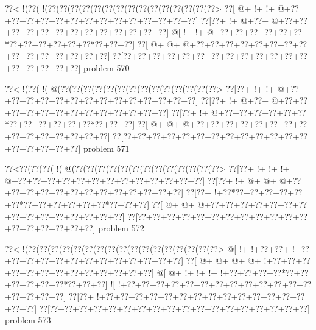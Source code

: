 \vbox{\vbox{\goo
\0??<\- !(\0??(\- !(\0??(\0??(\0??(\0??(\0??(\0??(\0??(\0??(\0??(\0??(\0??(\0??(\0??(\0??(\0??>
\0??[\- @+\- !+\- !+\- @+\0??+\0??+\0??+\0??+\0??+\0??+\0??+\0??+\0??+\0??+\0??+\0??+\0??+\0??]
\0??[\0??+\- !+\- @+\0??+\- @+\0??+\0??+\0??+\0??+\0??+\0??+\0??+\0??+\0??+\0??+\0??+\0??+\0??]
\- @[\- !+\- !+\- @+\0??+\0??+\0??+\0??+\0??+\0??*\0??+\0??+\0??+\0??+\0??+\0??*\0??+\0??+\0??]
\0??[\- @+\- @+\- @+\0??+\0??+\0??+\0??+\0??+\0??+\0??+\0??+\0??+\0??+\0??+\0??+\0??+\0??+\0??]
\0??[\0??+\0??+\0??+\0??+\0??+\0??+\0??+\0??+\0??+\0??+\0??+\0??+\0??+\0??+\0??+\0??+\0??+\0??]
}
\hfil problem 570\hfil\break
}



\vbox{\vbox{\goo
\0??<\- !(\0??(\- !(\- @(\0??(\0??(\0??(\0??(\0??(\0??(\0??(\0??(\0??(\0??(\0??(\0??(\0??(\0??>
\0??[\0??+\- !+\- !+\- @+\0??+\0??+\0??+\0??+\0??+\0??+\0??+\0??+\0??+\0??+\0??+\0??+\0??+\0??]
\0??[\0??+\- !+\- @+\0??+\- @+\0??+\0??+\0??+\0??+\0??+\0??+\0??+\0??+\0??+\0??+\0??+\0??+\0??]
\0??[\0??+\- !+\- @+\0??+\0??+\0??+\0??+\0??+\0??*\0??+\0??+\0??+\0??+\0??+\0??*\0??+\0??+\0??]
\0??[\- @+\- @+\- @+\0??+\0??+\0??+\0??+\0??+\0??+\0??+\0??+\0??+\0??+\0??+\0??+\0??+\0??+\0??]
\0??[\0??+\0??+\0??+\0??+\0??+\0??+\0??+\0??+\0??+\0??+\0??+\0??+\0??+\0??+\0??+\0??+\0??+\0??]
}
\hfil problem 571\hfil\break
}



\vbox{\vbox{\goo
\0??<\0??(\0??(\0??(\- !(\- @(\0??(\0??(\0??(\0??(\0??(\0??(\0??(\0??(\0??(\0??(\0??(\0??(\0??>
\0??[\0??+\- !+\- !+\- !+\- @+\0??+\0??+\0??+\0??+\0??+\0??+\0??+\0??+\0??+\0??+\0??+\0??+\0??]
\0??[\0??+\- !+\- @+\- @+\- @+\0??+\0??+\0??+\0??+\0??+\0??+\0??+\0??+\0??+\0??+\0??+\0??+\0??]
\0??[\0??+\- !+\0??*\0??+\0??+\0??+\0??+\0??+\0??*\0??+\0??+\0??+\0??+\0??+\0??*\0??+\0??+\0??]
\0??[\- @+\- @+\- @+\0??+\0??+\0??+\0??+\0??+\0??+\0??+\0??+\0??+\0??+\0??+\0??+\0??+\0??+\0??]
\0??[\0??+\0??+\0??+\0??+\0??+\0??+\0??+\0??+\0??+\0??+\0??+\0??+\0??+\0??+\0??+\0??+\0??+\0??]
}
\hfil problem 572\hfil\break
}



\vbox{\vbox{\goo
\0??<\- !(\0??(\0??(\0??(\0??(\0??(\0??(\0??(\0??(\0??(\0??(\0??(\0??(\0??(\0??(\0??(\0??(\0??>
\- @[\- !+\- !+\0??+\0??+\- !+\0??+\0??+\0??+\0??+\0??+\0??+\0??+\0??+\0??+\0??+\0??+\0??+\0??]
\0??[\- @+\- @+\- @+\- @+\- !+\0??+\0??+\0??+\0??+\0??+\0??+\0??+\0??+\0??+\0??+\0??+\0??+\0??]
\- @[\- @+\- !+\- !+\- !+\- !+\0??+\0??+\0??+\0??*\0??+\0??+\0??+\0??+\0??+\0??*\0??+\0??+\0??]
\- ![\- !+\0??+\0??+\0??+\0??+\0??+\0??+\0??+\0??+\0??+\0??+\0??+\0??+\0??+\0??+\0??+\0??+\0??]
\0??[\0??+\- !+\0??+\0??+\0??+\0??+\0??+\0??+\0??+\0??+\0??+\0??+\0??+\0??+\0??+\0??+\0??+\0??]
\0??[\0??+\0??+\0??+\0??+\0??+\0??+\0??+\0??+\0??+\0??+\0??+\0??+\0??+\0??+\0??+\0??+\0??+\0??]
}
\hfil problem 573\hfil\break
}



